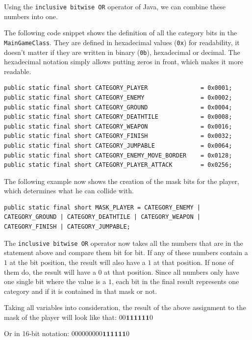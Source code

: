 \documentclass[12p]{article}
\begin{document}
Using the \texttt{inclusive bitwise OR} operator \cite{bitwiseOROperator} of Java, we can combine these numbers into one.

The following code snippet shows the definition of all the category bits in the \texttt{MainGameClass}. They are defined in hexadecimal values (\texttt{0x}) for readability, it doesn't matter if they are written in binary (\texttt{0b}), hexadecimal or decimal. The hexadecimal notation simply allows putting zeros in front, which makes it more readable.

\begin{verbatim}
public static final short CATEGORY_PLAYER               = 0x0001;
public static final short CATEGORY_ENEMY                = 0x0002;
public static final short CATEGORY_GROUND               = 0x0004;
public static final short CATEGORY_DEATHTILE            = 0x0008;
public static final short CATEGORY_WEAPON               = 0x0016;
public static final short CATEGORY_FINISH               = 0x0032;
public static final short CATEGORY_JUMPABLE             = 0x0064;
public static final short CATEGORY_ENEMY_MOVE_BORDER    = 0x0128;
public static final short CATEGORY_PLAYER_ATTACK        = 0x0256;
\end{verbatim}

The following example now shows the creation of the mask bits for the player, which determines what he can collide with.

\begin{verbatim}
public static final short MASK_PLAYER = CATEGORY_ENEMY | CATEGORY_GROUND | CATEGORY_DEATHTILE | CATEGORY_WEAPON | CATEGORY_FINISH | CATEGORY_JUMPABLE;
\end{verbatim}

The \texttt{inclusive bitwise OR} operator now takes all the numbers that are in the statement above and compare them bit for bit. If any of these numbers contain a $1$ at the bit position, the result will also have a $1$ at that position. If none of them do, the result will have a $0$ at that position. Since all numbers only have one single bit where the value is a $1$, each bit in the final result represents one category and if it is contained in that mask or not.

Taking all variables into consideration, the result of the above assignment to the mask of the player will look like that: $00\mathbf{111111}0$

Or in 16-bit notation: $000000000\mathbf{111111}0$
\end{document}
